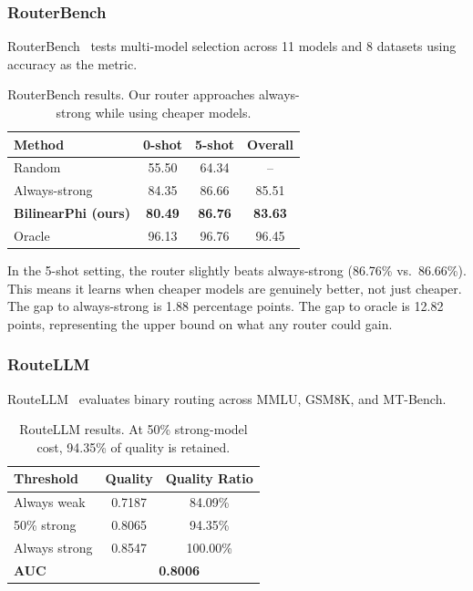 \subsubsection{RouterBench}

RouterBench~\citep{hu2024routerbench} tests multi-model selection across 11 models and 8 datasets using accuracy as the metric.

\begin{table}[h]
\centering
\caption{RouterBench results. Our router approaches always-strong while using cheaper models.}
\label{tab:routerbench_results}
\small
\begin{tabular}{lccc}
\toprule
\textbf{Method} & \textbf{0-shot} & \textbf{5-shot} & \textbf{Overall} \\
\midrule
Random & 55.50 & 64.34 & -- \\
Always-strong & 84.35 & 86.66 & 85.51 \\
\textbf{BilinearPhi (ours)} & \textbf{80.49} & \textbf{86.76} & \textbf{83.63} \\
Oracle & 96.13 & 96.76 & 96.45 \\
\bottomrule
\end{tabular}
\end{table}

In the 5-shot setting, the router slightly beats always-strong (86.76\% vs.\ 86.66\%). This means it learns when cheaper models are genuinely better, not just cheaper. The gap to always-strong is 1.88 percentage points. The gap to oracle is 12.82 points, representing the upper bound on what any router could gain.

\subsubsection{RouteLLM}

RouteLLM~\citep{ong2024routellm} evaluates binary routing across MMLU, GSM8K, and MT-Bench.

\begin{table}[h]
\centering
\caption{RouteLLM results. At 50\% strong-model cost, 94.35\% of quality is retained.}
\label{tab:routellm_results}
\small
\begin{tabular}{lcc}
\toprule
\textbf{Threshold} & \textbf{Quality} & \textbf{Quality Ratio} \\
\midrule
Always weak & 0.7187 & 84.09\% \\
50\% strong & 0.8065 & 94.35\% \\
Always strong & 0.8547 & 100.00\% \\
\midrule
\textbf{AUC} & \multicolumn{2}{c}{\textbf{0.8006}} \\
\bottomrule
\end{tabular}
\end{table}

